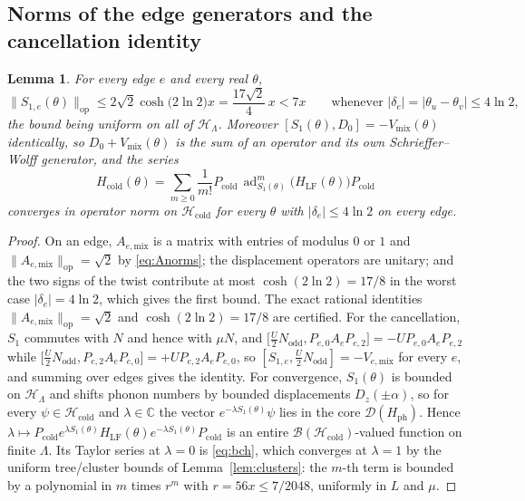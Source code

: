 \documentclass[11pt]{article}
\theoremstyle{plain}
\newtheorem{lemma}{Lemma}
\theoremstyle{definition}
\newcommand{\ad}{\operatorname{ad}}
\begin{document}
\subsection{Norms of the edge generators and the cancellation identity}

\begin{lemma}\label{lem:norms}
For every edge $e$ and every real $\theta$,
\begin{equation}\label{eq:s1norm}
\|S_{1,e}(\theta)\|_{\mathrm{op}}\le2\sqrt{2}\cosh\!\bigl(2\ln2\bigr)x
=\frac{17\sqrt2}{4}\,x<7x \qquad\text{whenever } |\delta_{e}|=|\theta_u-\theta_v|\le4\ln2 ,
\end{equation}
the bound being uniform on all of $\mathcal{H}_\Lambda$. Moreover
$[S_1(\theta),D_0]=-V_{\mathrm{mix}}(\theta)$ identically, so $D_0+V_{\mathrm{mix}}(\theta)$
is the sum of an operator and its own Schrieffer--Wolff generator, and the series
\begin{equation}\label{eq:bch}
H_{\mathrm{cold}}(\theta)=\sum_{m\ge0}\frac{1}{m!}P_{\mathrm{cold}}\,
\ad_{S_1(\theta)}^{m}\bigl(H_{\mathrm{LF}}(\theta)\bigr)P_{\mathrm{cold}}
\end{equation}
converges in operator norm on $\mathcal{H}_{\mathrm{cold}}$ for every $\theta$
with $|\delta_e|\le4\ln2$ on every edge.
\end{lemma}

\begin{proof}
On an edge, $A_{e,\mathrm{mix}}$ is a matrix with entries of modulus $0$ or $1$
and $\|A_{e,\mathrm{mix}}\|_{\mathrm{op}}=\sqrt2$ by \eqref{eq:Anorms}; the
displacement operators are unitary; and the two signs of the twist contribute at
most $\cosh(2\ln2)=17/8$ in the worst case $|\delta_e|=4\ln2$, which gives the
first bound. The exact rational identities
$\|A_{e,\mathrm{mix}}\|_{\mathrm{op}}=\sqrt2$ and
$\cosh(2\ln2)=17/8$ are certified. For the cancellation, $S_1$ commutes with $N$
and hence with $\mu N$, and
$\bigl[\tfrac{U}{2}N_{\mathrm{odd}},P_{e,0}A_eP_{e,2}\bigr]
=-UP_{e,0}A_eP_{e,2}$ while
$\bigl[\tfrac{U}{2}N_{\mathrm{odd}},P_{e,2}A_eP_{e,0}\bigr]=+UP_{e,2}A_eP_{e,0}$,
so $[S_{1,e},\tfrac{U}{2}N_{\mathrm{odd}}]=-V_{e,\mathrm{mix}}$ for every $e$,
and summing over edges gives the identity. For convergence, $S_1(\theta)$ is
bounded on $\mathcal{H}_\Lambda$ and shifts phonon numbers by bounded
displacements $D_z(\pm\alpha)$, so for every $\psi\in\mathcal{H}_{\mathrm{cold}}$
and $\lambda\in\mathbb{C}$ the vector $e^{-\lambda S_1(\theta)}\psi$ lies in the
core $\mathcal{D}(H_{\mathrm{ph}})$. Hence
$\lambda\mapsto P_{\mathrm{cold}}e^{\lambda S_1(\theta)}H_{\mathrm{LF}}(\theta)
e^{-\lambda S_1(\theta)}P_{\mathrm{cold}}$ is an entire
$\mathcal{B}(\mathcal{H}_{\mathrm{cold}})$-valued function on finite $\Lambda$.
Its Taylor series at $\lambda=0$ is \eqref{eq:bch}, which converges at
$\lambda=1$ by the uniform tree/cluster bounds of Lemma~\ref{lem:clusters}: the
$m$-th term is bounded by a polynomial in $m$ times $r^{m}$ with
$r=56x\le7/2048$, uniformly in $L$ and $\mu$.
\end{proof}
\end{document}
